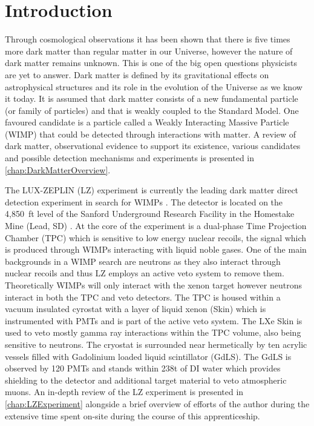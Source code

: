 \chapter{Introduction}
Through cosmological observations it has been shown that there is five times more dark matter than regular matter in our Universe, however the nature of dark matter remains unknown. This is one of the big open questions physicists are yet to answer. Dark matter is defined by its gravitational effects on astrophysical structures and its role in the evolution of the Universe as we know it today. It is assumed that dark matter consists of a new fundamental particle (or family of particles) and that is weakly coupled to the Standard Model. One favoured candidate is a particle called a Weakly Interacting Massive Particle (WIMP) that could be detected through interactions with matter. A review of dark matter, observational evidence to support its existence, various candidates and possible detection mechanisms and experiments is presented in \autoref{chap:DarkMatterOverview}.

The LUX-ZEPLIN (LZ) experiment is currently the leading dark matter direct detection experiment in search for WIMPs \cite{LZCollaboration:2024lux}. The detector is located on the 4,850~ft level of the Sanford Underground Research Facility in the Homestake Mine (Lead, SD) \cite{LZNIMA}. At the core of the experiment is a dual-phase Time Projection Chamber (TPC) which is sensitive to low energy nuclear recoils, the signal which is produced through WIMPs interacting with liquid noble gases. One of the main backgrounds in a WIMP search are neutrons as they also interact through nuclear recoils and thus LZ employs an active veto system to remove them. Theoretically WIMPs will only interact with the xenon target however neutrons interact in both the TPC and veto detectors. The TPC is housed within a vacuum insulated cyrostat with a layer of liquid xenon (Skin) which is instrumented with PMTs and is part of the active veto system. The LXe Skin is used to veto mostly gamma ray interactions within the TPC volume, also being sensitive to neutrons. The cryostat is surrounded near hermetically by ten acrylic vessels filled with  Gadolinium loaded liquid scintillator (GdLS). The GdLS is observed by 120 PMTs and stands within 238t of DI water which provides shielding to the detector and additional target material to veto atmospheric muons. An in-depth review of the LZ experiment is presented in \autoref{chap:LZExperiment} alongside a brief overview of efforts of the author during the extensive time spent on-site during the course of this apprenticeship. 

